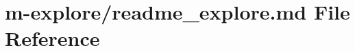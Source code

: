 \hypertarget{readme__explore_8md}{}\section{m-\/explore/readme\+\_\+explore.md File Reference}
\label{readme__explore_8md}
